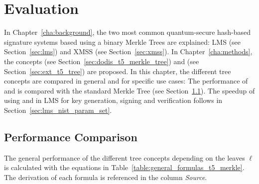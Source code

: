 \chapter{Evaluation}
\label{cha:evaluation}
In Chapter~\ref{cha:background}, the two most common quantum-secure hash-based signature systems based using a binary Merkle Trees are explained: LMS (see Section~\ref{sec:lms}) and XMSS (see Section~\ref{sec:xmss}). In Chapter~\ref{cha:methods}, the concepts \tftree (see Section~\ref{sec:dodis_t5_merkle_tree}) and \extree (see Section~\ref{sec:ext_t5_tree}) are proposed. In this chapter, the different tree concepts are compared in general and for specific use cases: The performance of \tftree and \extree is compared with the standard Merkle Tree (see Section~\ref{sec:performance_comparison}). 
The speedup of using \tftree and \extree in LMS for key generation, signing and verification follows in Section~\ref{sec:lms_nist_param_set}. 

\section{Performance Comparison}
\label{sec:performance_comparison}
The general performance of the different tree concepts depending on the leaves $\ell$ is calculated with the equations in Table~\ref{table:general_formulas_t5_merkle}. The derivation of each formula is referenced in the column \textit{Source}.

